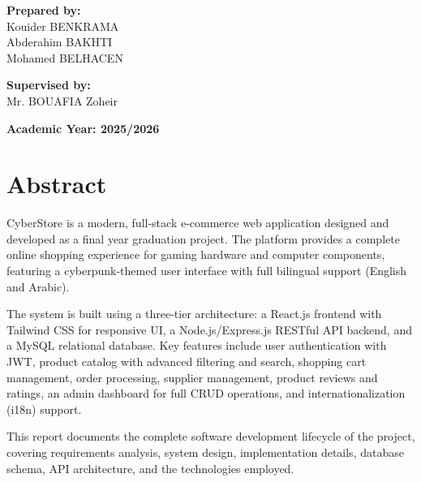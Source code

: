 \documentclass[12pt,a4paper]{report}
\begin{document}
\begin{titlepage}
\begin{center}
    \vspace{1cm}

    \begin{minipage}[t]{0.45\textwidth}
      \raggedright
      {\large\bfseries Prepared by:}\\[0.3cm]
      {\normalsize Kouider BENKRAMA}\\[0.1cm]
      {\normalsize Abderahim BAKHTI}\\[0.1cm]
      {\normalsize Mohamed BELHACEN}\\
    \end{minipage}
    \hfill
    \begin{minipage}[t]{0.45\textwidth}
      \raggedright
      {\large\bfseries Supervised by:}\\[0.3cm]
      {\normalsize Mr. BOUAFIA Zoheir}\\
    \end{minipage}

    \vfill

    {\large\bfseries Academic Year: 2025/2026}
  \end{center}
\end{titlepage}

\chapter*{Abstract}

CyberStore is a modern, full-stack e-commerce web application designed and developed as a final year graduation project. The platform provides a complete online shopping experience for gaming hardware and computer components, featuring a cyberpunk-themed user interface with full bilingual support (English and Arabic).

The system is built using a three-tier architecture: a React.js frontend with Tailwind CSS for responsive UI, a Node.js/Express.js RESTful API backend, and a MySQL relational database. Key features include user authentication with JWT, product catalog with advanced filtering and search, shopping cart management, order processing, supplier management, product reviews and ratings, an admin dashboard for full CRUD operations, and internationalization (i18n) support.

This report documents the complete software development lifecycle of the project, covering requirements analysis, system design, implementation details, database schema, API architecture, and the technologies employed.
\end{document}
